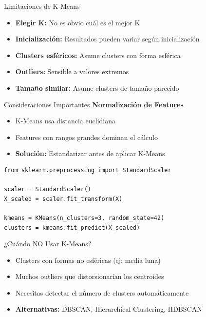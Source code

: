 \documentclass{beamer}
\begin{document}
\begin{frame}{Limitaciones de K-Means}
    \begin{itemize}
        \item<1-> \textbf{Elegir K:} No es obvio cuál es el mejor K
        \item<2-> \textbf{Inicialización:} Resultados pueden variar según inicialización
        \item<3-> \textbf{Clusters esféricos:} Asume clusters con forma esférica
        \item<4-> \textbf{Outliers:} Sensible a valores extremos
        \item<5-> \textbf{Tamaño similar:} Asume clusters de tamaño parecido
    \end{itemize}
\end{frame}

\begin{frame}[fragile]{Consideraciones Importantes}
    \textbf{Normalización de Features}
    \begin{itemize}
        \item<1-> K-Means usa distancia euclidiana
        \item<2-> Features con rangos grandes dominan el cálculo
        \item<3-> \textbf{Solución:} Estandarizar antes de aplicar K-Means
    \end{itemize}
    \vspace{1em}
    \begin{lstlisting}
from sklearn.preprocessing import StandardScaler

scaler = StandardScaler()
X_scaled = scaler.fit_transform(X)

kmeans = KMeans(n_clusters=3, random_state=42)
clusters = kmeans.fit_predict(X_scaled)
    \end{lstlisting}
\end{frame}

\begin{frame}{¿Cuándo NO Usar K-Means?}
    \begin{itemize}
        \item<1-> Clusters con formas no esféricas (ej: media luna)
        \item<2-> Muchos outliers que distorsionarían los centroides
        \item<3-> Necesitas detectar el número de clusters automáticamente
        \item<4-> \textbf{Alternativas:} DBSCAN, Hierarchical Clustering, HDBSCAN
    \end{itemize}
\end{frame}
\end{document}
